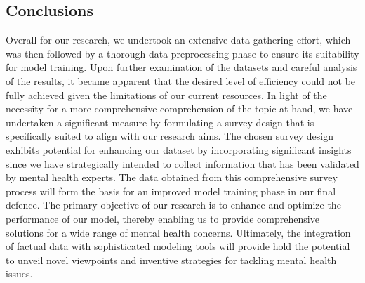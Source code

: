 \documentclass[a0,landscape]{a0poster}
\begin{document}
\begin{multicols}{4}
\color{SaddleBrown} %

\section*{Conclusions}

Overall for our research, we undertook an extensive data-gathering effort, which was
then followed by a thorough data preprocessing phase to ensure its suitability for
model training. Upon further examination of the datasets and careful analysis of
the results, it became apparent that the desired level of efficiency could not be fully
achieved given the limitations of our current resources. In light of the necessity for
a more comprehensive comprehension of the topic at hand, we have undertaken a
significant measure by formulating a survey design that is specifically suited to align
with our research aims. The chosen survey design exhibits potential for enhancing
our dataset by incorporating significant insights since we have strategically intended
to collect information that has been validated by mental health experts. The data
obtained from this comprehensive survey process will form the basis for an improved
model training phase in our final defence. The primary objective of our research is to
enhance and optimize the performance of our model, thereby enabling us to provide
comprehensive solutions for a wide range of mental health concerns. Ultimately,
the integration of factual data with sophisticated modeling tools will provide hold
the potential to unveil novel viewpoints and inventive strategies for tackling mental
health issues.












\color{DarkSlateGray}
\nocite{*} %





\end{multicols}
\end{document}
